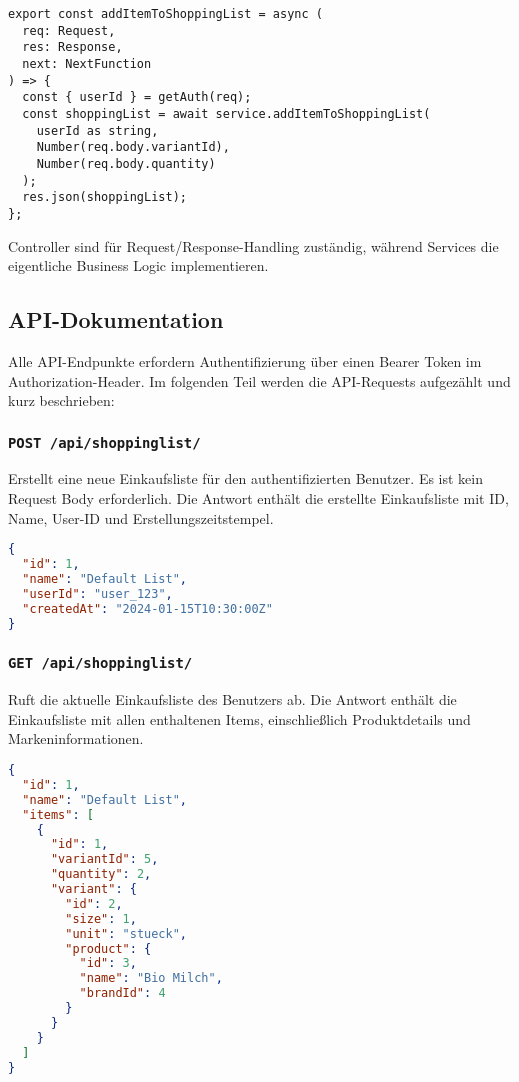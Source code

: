 \begin{lstlisting}[style=typescriptstyle,caption={Controller-Beispiel: Shopping List}]
export const addItemToShoppingList = async (
  req: Request,
  res: Response,
  next: NextFunction
) => {
  const { userId } = getAuth(req);
  const shoppingList = await service.addItemToShoppingList(
    userId as string,
    Number(req.body.variantId),
    Number(req.body.quantity)
  );
  res.json(shoppingList);
};
\end{lstlisting}

Controller sind für Request/Response-Handling zuständig, während Services die eigentliche Business Logic implementieren.

\subsection{API-Dokumentation}

Alle API-Endpunkte erfordern Authentifizierung über einen Bearer Token im Authorization-Header. Im folgenden Teil werden die API-Requests aufgezählt und kurz beschrieben:

\subsubsection{\texttt{POST /api/shoppinglist/}}

Erstellt eine neue Einkaufsliste für den authentifizierten Benutzer. Es ist kein Request Body erforderlich. Die Antwort enthält die erstellte Einkaufsliste mit ID, Name, User-ID und Erstellungszeitstempel.

\begin{lstlisting}[language=JSON]
{
  "id": 1,
  "name": "Default List",
  "userId": "user_123",
  "createdAt": "2024-01-15T10:30:00Z"
}
\end{lstlisting}

\subsubsection{\texttt{GET /api/shoppinglist/}}

Ruft die aktuelle Einkaufsliste des Benutzers ab. Die Antwort enthält die Einkaufsliste mit allen enthaltenen Items, einschließlich Produktdetails und Markeninformationen.

\begin{lstlisting}[language=JSON]
{
  "id": 1,
  "name": "Default List",
  "items": [
    {
      "id": 1,
      "variantId": 5,
      "quantity": 2,
      "variant": {
        "id": 2,
        "size": 1,
        "unit": "stueck",
        "product": {
          "id": 3,
          "name": "Bio Milch",
          "brandId": 4
        }
      }
    }
  ]
}
\end{lstlisting}

